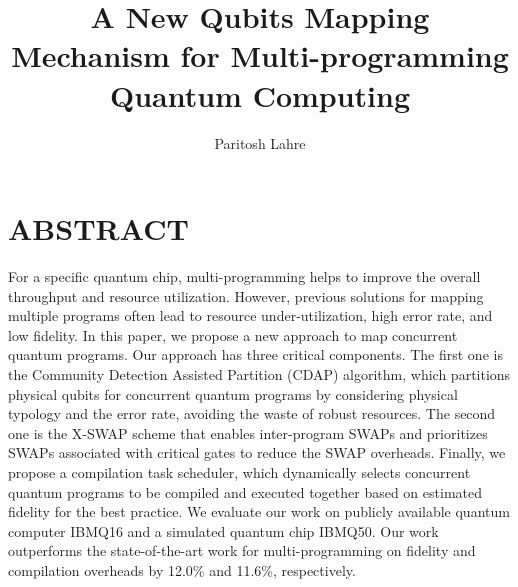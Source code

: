 \documentclass{article}
\title{\textbf{A New Qubits Mapping Mechanism for Multi-programming
	Quantum Computing}}
\author{Paritosh Lahre}
\date{}
\begin{document}
	\maketitle
	\section*{ABSTRACT}
		For a specific quantum chip, multi-programming helps to improve
		the overall throughput and resource utilization. However, previous
		solutions for mapping multiple programs often lead to resource
		under-utilization, high error rate, and low fidelity. In this paper, we
		propose a new approach to map concurrent quantum programs.
		Our approach has three critical components. The first one is the
		Community Detection Assisted Partition (CDAP) algorithm, which
		partitions physical qubits for concurrent quantum programs by considering physical typology and the error rate, avoiding the waste
		of robust resources. The second one is the X-SWAP scheme that enables inter-program SWAPs and prioritizes SWAPs associated with
		critical gates to reduce the SWAP overheads. Finally, we propose a
		compilation task scheduler, which dynamically selects concurrent
		quantum programs to be compiled and executed together based
		on estimated fidelity for the best practice. We evaluate our work
		on publicly available quantum computer IBMQ16 and a simulated
		quantum chip IBMQ50. Our work outperforms the state-of-the-art
		work for multi-programming on fidelity and compilation overheads
		by 12.0\% and 11.6\%, respectively.
\end{document}

